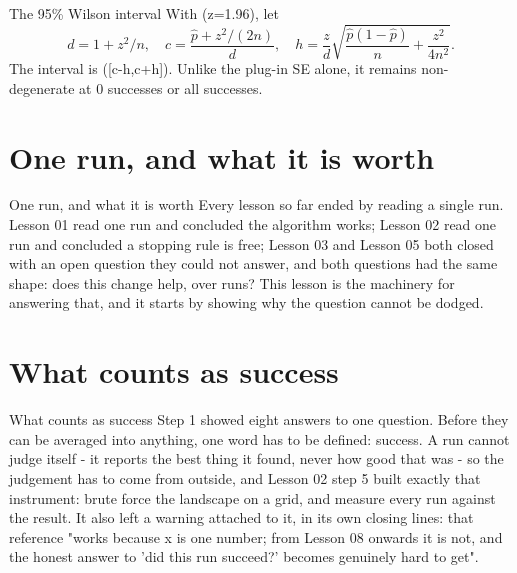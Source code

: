 \begin{frame}{The 95\% Wilson interval}
With (z=1.96), let
\[
d=1+z^2/n,\quad c=\frac{\hat p+z^2/(2n)}d,\quad
h=\frac z d\sqrt{\frac{\hat p(1-\hat p)}n+\frac{z^2}{4n^2}}.
\]
The interval is ([c-h,c+h]). Unlike the plug-in SE alone, it remains
non-degenerate at 0 successes or all successes.
\end{frame}

\section{One run, and what it is worth}

\begin{frame}{One run, and what it is worth}
Every lesson so far ended by reading a single run. Lesson 01 read one run and
concluded the algorithm works; Lesson 02 read one run and concluded a stopping
rule is free; Lesson 03 and Lesson 05 both closed with an open question they
could not answer, and both questions had the same shape: does this change help,
over runs? This lesson is the machinery for answering that, and it starts by
showing why the question cannot be dodged.
\end{frame}


\section{What counts as success}

\begin{frame}{What counts as success}
Step 1 showed eight answers to one question. Before they can be averaged into
anything, one word has to be defined: success. A run cannot judge itself - it
reports the best thing it found, never how good that was - so the judgement has
to come from outside, and Lesson 02 step 5 built exactly that instrument: brute
force the landscape on a grid, and measure every run against the result. It also
left a warning attached to it, in its own closing lines: that reference "works
because x is one number; from Lesson 08 onwards it is not, and the honest answer
to 'did this run succeed?' becomes genuinely hard to get".
\end{frame}

